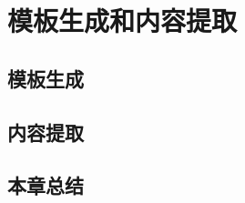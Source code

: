
\chapter{模板生成和内容提取}
\label{chap:template}

\section{模板生成}
\label{sec:templategen}

\section{内容提取}
\label{sec:extraction}

\section{本章总结}
\label{sec:summarytemplate}


